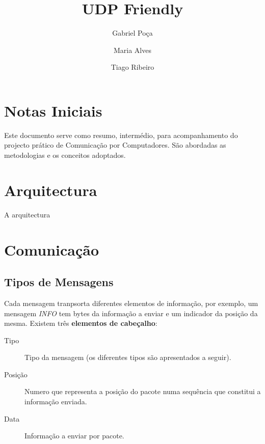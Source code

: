 \documentclass{llncs}
\begin{document}
\mainmatter
\title{UDP Friendly}


\author{Gabriel Poça \and Maria Alves \and Tiago Ribeiro}



\date{}


\maketitle

\section{Notas Iniciais}
Este documento serve como resumo, intermédio, para acompanhamento do projecto prático de Comunicação por Computadores. São abordadas as metodologias e os conceitos adoptados.

\section{Arquitectura}
A arquitectura 

\section{Comunicação}
\subsection{Tipos de Mensagens}


Cada mensagem tranpsorta diferentes elementos de informação, por exemplo, um mensagem \textit{INFO} tem bytes da informação a enviar e um indicador da posição da mesma. Existem três \textbf{elementos de cabeçalho}:


\begin{description}
	\item[Tipo] 	Tipo da mensagem (os diferentes tipos são apresentados a seguir).
	\item[Posição] 	Numero que representa a posição do pacote numa sequência que constitui a informação enviada.
	\item[Data] 	Informação a enviar por pacote.
\end{description}
\end{document}
